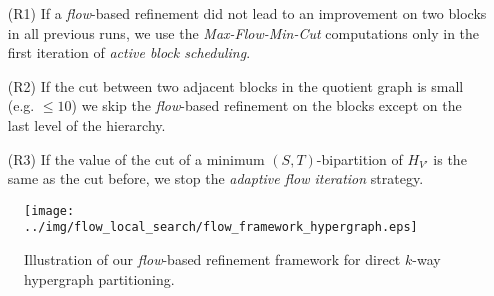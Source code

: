 \begin{enumerate}
\item[(R1)] If a \emph{flow}-based refinement did not lead to an improvement on two blocks in all previous
            runs, we use the \emph{Max-Flow-Min-Cut} computations only in the first iteration of 
            \emph{active block scheduling}.
\item[(R2)] If the cut between two adjacent blocks in the quotient graph is small (e.g. $\le 10$) we
            skip the \emph{flow}-based refinement on the blocks except on the last level of the hierarchy.
\item[(R3)] If the value of the cut of a minimum $(S,T)$-bipartition of $H_{V'}$ is the same 
            as the cut before, we stop the \emph{adaptive flow iteration} strategy.
\end{enumerate}

\begin{figure}
\centering 
\texttt{[image: ../img/flow\_local\_search/flow\_framework\_hypergraph.eps]}
\caption{Illustration of our \emph{flow}-based refinement framework for direct $k$-way hypergraph
         partitioning.}
\label{img:flow_framework}
\end{figure} 



